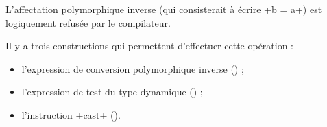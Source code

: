 L'affectation polymorphique inverse (qui consisterait à écrire \ggs+b = a+) est logiquement refusée par le compilateur.

Il y a trois constructions qui permettent d'effectuer cette opération :
\begin{itemize}
  \item l'expression de conversion polymorphique inverse () ;
  \item l'expression de test du type dynamique () ;
  \item l'instruction \ggs+cast+ ().
\end{itemize}

%
%
%
%
%
%
%
%


